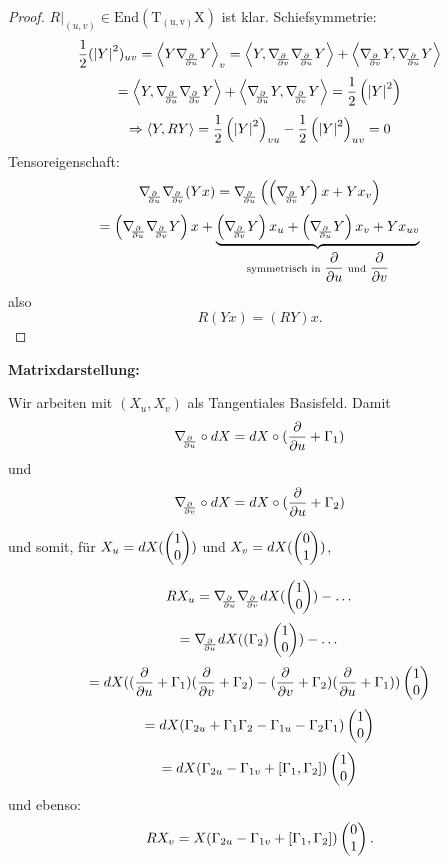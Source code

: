 \begin{proof}
	
	$R\big|_{(u,v)} \in \mathrm{End(T_{(u,v)}X)}$ ist klar.
	Schiefsymmetrie:
		\[\frac12 (\abs{Y}^2)_{uv} = \skal{Y \nabla_{\!\!{\partial\over \partial u}}Y}_v = \skal{Y, \nabla_{\!\!{\partial\over \partial v}}\nabla_{\!\!{\partial\over \partial u}}Y} + \skal{\nabla_{\!\!{\partial\over \partial v}}Y,\nabla_{\!\!{\partial\over \partial u}}Y} \]
		\[ = \skal{Y, \nabla_{\!\!{\partial\over \partial u}}\nabla_{\!\!{\partial\over \partial v}}Y} + \skal{\nabla_{\!\!{\partial\over \partial u}}Y, \nabla_{\!\!{\partial\over \partial v}}Y} = \frac12 \left( \abs{Y}^2\right)  \]
		\[ \Rightarrow \left \langle Y,RY \right\rangle = \frac12 \left(\left| Y\right|^2\right)_{vu}- \frac12\left(\left| Y\right|^2\right)_{uv}=0 \]
	Tensoreigenschaft:
		\[ \nabla_{\!\!{\partial\over \partial u}}\nabla_{\!\!{\partial\over \partial v}}(Yx)= \nabla_{\!\!{\partial\over \partial u}}\left(\left( \nabla_{\!\!{\partial\over \partial v}}Y \right)x + Yx_v\right) \]
		\[ = \left( \nabla_{\!\!{\partial\over \partial u}} \nabla_{\!\!{\partial\over \partial v}} Y \right)x + \underbrace{\left( \nabla_{\!\!{\partial\over \partial v}}Y \right)x_u + \left( \nabla_{\!\!{\partial\over \partial u}}Y \right)x_v + Yx_{uv}}_{\text{symmetrisch in } \dfrac{\partial}{\partial u} \text{ und } \dfrac{\partial}{\partial v}} \]
	also
		\[ R(Yx)=(RY)x. \]
	
\end{proof}

\textbf{Matrixdarstellung:}
	
	Wir arbeiten mit $ (X_u,X_v) $ als Tangentiales Basisfeld. Damit 
		\[ \nabla_{\!\!{\partial\over \partial u}} \circ dX = dX \circ ( \dfrac{\partial}{\partial u} + \Gamma_{1} ) \] 
	und 
		\[ \nabla_{\!\!{\partial\over \partial v}}  \circ dX = dX \circ ( \dfrac{\partial}{\partial u} + \Gamma_{2}) \]
		
	und somit, für $ X_u = dX(\begin{pmatrix} 1 \\ 0 \end{pmatrix}) $ und $ X_v = dX(\begin{pmatrix} 0 \\ 1 \end{pmatrix}) $,
	
		\[ RX_u = \nabla_{\!\!{\partial\over \partial u}}\nabla_{\!\!{\partial\over \partial v}} dX(\begin{pmatrix} 1 \\ 0 \end{pmatrix}) - \dots \]
		\[ = \nabla_{\!\!{\partial\over \partial u}} dX((\Gamma_2) \begin{pmatrix} 1 \\ 0 \end{pmatrix}) - \dots \]
		\[ = dX((\dfrac{\partial}{\partial u} + \Gamma_1)(\dfrac{\partial}{\partial v} + \Gamma_2)-(\dfrac{\partial}{\partial v} + \Gamma_2) ( \dfrac{\partial}{\partial u} + \Gamma_{1} )) \begin{pmatrix} 1 \\ 0 \end{pmatrix} \]
		\[ = dX( \Gamma_{2u} + \Gamma_1\Gamma_2 - \Gamma_{1u} - \Gamma_{2}\Gamma_{1} ) \begin{pmatrix} 1 \\ 0 \end{pmatrix} \]
		\[ = dX (\Gamma_{2u}-\Gamma_{1v} + [\Gamma_{1},\Gamma_{2}]) \begin{pmatrix} 1 \\ 0 \end{pmatrix} \] 
	und ebenso:
		\[ RX_v = X (\Gamma_{2u}-\Gamma_{1v} + [\Gamma_{1},\Gamma_{2}])\begin{pmatrix} 0 \\ 1 \end{pmatrix}. \]
		
